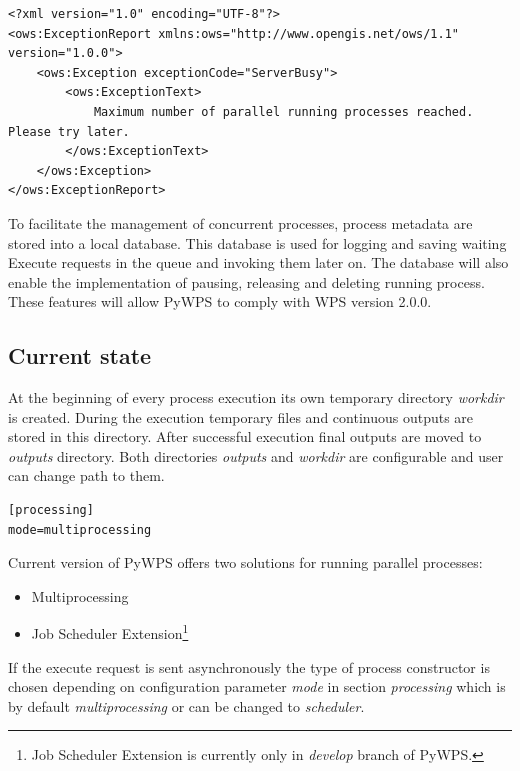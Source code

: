 \begin{lstlisting}[basicstyle=\small,caption={Resource exceeded exception},label={lst:Isolation_rejected}]
<?xml version="1.0" encoding="UTF-8"?>
<ows:ExceptionReport xmlns:ows="http://www.opengis.net/ows/1.1" version="1.0.0">
    <ows:Exception exceptionCode="ServerBusy">
        <ows:ExceptionText>
            Maximum number of parallel running processes reached. Please try later.
        </ows:ExceptionText>
    </ows:Exception>
</ows:ExceptionReport>
\end{lstlisting}

To facilitate the management of concurrent processes, process metadata
are stored into a local database. This database is used for logging
and saving waiting Execute requests in the queue and invoking them
later on. The database will also enable the implementation of
pausing, releasing and deleting running process. These features will
allow PyWPS to comply with WPS version 2.0.0.

\subsection{Current state}
\label{subsec:current_state}
At the beginning of every process execution its own temporary directory \textit{workdir} is created. During the execution
temporary files and continuous outputs are stored in this directory. After successful execution final outputs are
moved to \textit{outputs} directory. Both directories \textit{outputs} and \textit{workdir} are configurable and user can
change path to them.

\bigskip
\begin{lstlisting}[basicstyle=\small,caption={pywps.cfg - mode parameter}]
[processing]
mode=multiprocessing
\end{lstlisting}

Current version of PyWPS offers two solutions for running parallel processes:
\begin{itemize}
\item Multiprocessing
\item Job Scheduler Extension\footnote{Job Scheduler Extension is currently only in \textit{develop} branch of PyWPS.}
\end{itemize}

If the execute request is sent asynchronously the type of process constructor is chosen depending on configuration
parameter \textit{mode} in section \textit{processing} which is by default \textit{multiprocessing} or can be changed 
to \textit{scheduler}.

